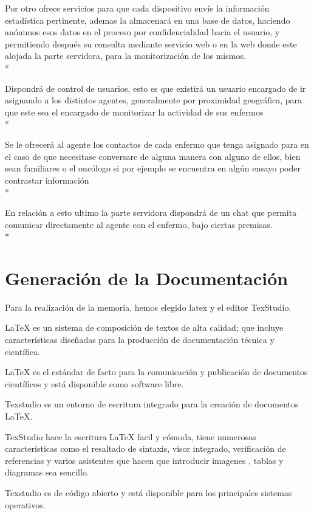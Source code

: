 \documentclass[../pfc.tex]{subfiles}
\begin{document}
	Por otro ofrece servicios para que cada dispositivo envíe la información estadística pertinente, ademas la almacenará en una base de datos, haciendo anónimos esos datos en el proceso por confidencialidad hacia el usuario, y permitiendo después su consulta mediante servicio web o en la web donde este alojada la parte servidora, para la monitorización de los mismos.\\*
	
	Dispondrá de control de usuarios, esto es que existirá un usuario encargado de ir asignando a los distintos agentes, generalmente por proximidad geográfica, para que este sea el encargado de monitorizar la actividad de sus enfermos \\*
	
	Se le ofrecerá al agente los contactos de cada enfermo que tenga asignado para en el caso de que necesitase conversare de alguna manera con alguno de ellos, bien sean familiares o el oncólogo si por ejemplo se encuentra en algún ensayo poder contrastar información\\*
	
	En relación a esto ultimo la parte servidora dispondrá de un chat que permita comunicar directamente al agente con el enfermo, bajo ciertas premisas.\\* 
	
	\clearpage
	
	\section{Generación de la Documentación}
	
	Para la realización de la memoria, hemos elegido latex y el editor TexStudio.
	
	LaTeX es un sistema de composición de textos de alta calidad; que incluye características diseñadas para la producción de documentación técnica y científica.
	
	LaTeX es el estándar de facto para la comunicación y publicación de documentos científicos y está disponible como software libre.
	
	Texstudio es un entorno de escritura integrado para la creación de documentos LaTeX. 
	
	TexStudio hace la escritura LaTeX facil y cómoda, tiene numerosas características como el resaltado de sintaxis, visor integrado, verificación de referencias y varios asistentes que hacen que introducir imagenes , tablas y diagramas sea sencillo. 
	
	Texstudio es de código abierto y está disponible para los principales sistemas operativos.
	
\end{document}
